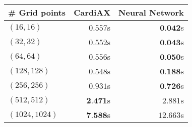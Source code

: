 \begin{table}
    \centering
\begin{tabular}{l r r}                    
    \hline
    \textbf{\# Grid points} & \textbf{CardiAX} & \textbf{Neural Network} \\
    \hline
    $(16, 16)$ & $0.557$s & $\textbf{0.042}$s \\ [2pt]
    $(32, 32)$ & $0.552$s & $\textbf{0.043}$s \\ [2pt]
    $(64, 64)$ & $0.556$s & $\textbf{0.050}$s \\ [2pt]
    $(128, 128)$ & $0.548$s & $\textbf{0.188}$s \\ [2pt]
    $(256, 256)$ & $0.931$s & $\textbf{0.726}$s \\ [2pt]
    $(512, 512)$ & $\textbf{2.471}$s & $2.881$s \\ [2pt]
    $(1024, 1024)$ & $\textbf{7.588}$s & $12.663$s \\
    \hline
\end{tabular}
\end{table}
